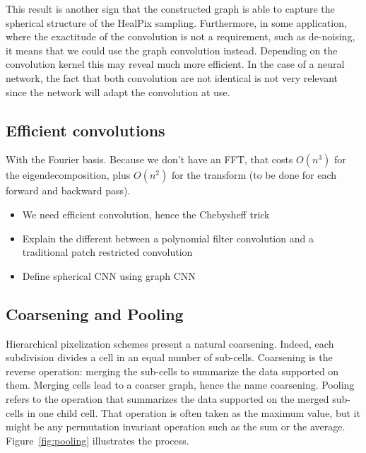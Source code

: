 \documentclass[final,twocolumn,3p,times,authoryear]{elsarticle}
\newcommand{\assign}[1]{{\color[rgb]{.8,.5,.8}{Assigned: #1 }}}
\newcommand{\figref}[1]{Figure~\ref{fig:#1}}
\newcommand{\1}{\b{1}}              %
\newcommand{\0}{\b{0}}              %
\begin{document}
This result is another sign that the constructed graph is able to capture the spherical
structure of the HealPix sampling. Furthermore, in some application, where the
exactitude of the convolution is not a requirement, such as de-noising, it means
that we could use the graph convolution instead. Depending on the convolution kernel
this may reveal much more efficient. In the case of a neural network, the fact
that both convolution are not identical is not very relevant since the network
will adapt the convolution at use.


\subsection{Efficient convolutions}
\assign{Michaël}
With the Fourier basis. Because we don't have an FFT, that costs $O(n^3)$ for the eigendecomposition, plus $O(n^2)$ for the transform (to be done for each forward and backward pass).
\begin{itemize}
	\item We need efficient convolution, hence the Chebysheff trick
	\item Explain the different between a polynomial filter convolution and a traditional patch restricted convolution
	\item Define spherical CNN using graph CNN
\end{itemize}

\subsection{Coarsening and Pooling}

Hierarchical pixelization schemes present a natural coarsening. Indeed, each subdivision divides a cell in an equal number of sub-cells. Coarsening is the reverse operation: merging the sub-cells to summarize the data supported on them. Merging cells lead to a coarser graph, hence the name coarsening. Pooling refers to the operation that summarizes the data supported on the merged sub-cells in one child cell. That operation is often taken as the maximum value, but it might be any permutation invariant operation such as the sum or the average. \figref{pooling} illustrates the process.

\end{document}
